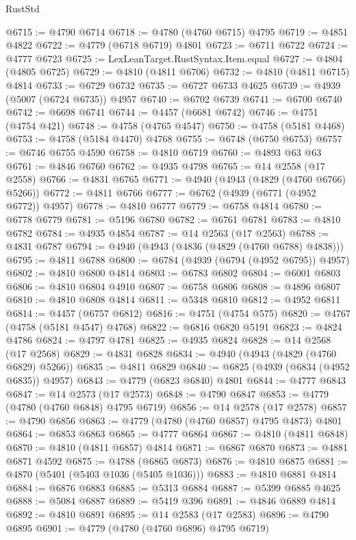 \begin{lexlean}{RustStd}
\begin{coremodule}
@6715 := @4790 @6714
@6718 := @4780 (@4760 @6715) @4795
@6719 := @4851 @4822
@6722 := @4779 (@6718 @6719) @4801
@6723 := @6711 @6722
@6724 := @4777 @6723
@6725 := LexLeanTarget.RustSyntax.Item.equal
@6727 := @4804 (@4805 @6725)
@6729 := @4810 (@4811 @6706)
@6732 := @4810 (@4811 @6715) @4814
@6733 := @6729 @6732
@6735 := @6727 @6733 @4625
@6739 := @4939 (@5007 (@6724 @6735)) @4957
@6740 := @6702 @6739
@6741 := @6700 @6740
@6742 := @6698 @6741
@6744 := @4457 (@6681 @6742)
@6746 := @4751 (@4754 @421)
@6748 := @4758 (@4765 @4547)
@6750 := @4758 (@5181 @4468)
@6753 := @4758 (@5184 @4470) @4768
@6755 := @6748 (@6750 @6753)
@6757 := @6746 @6755 @4590
@6758 := @4810 @6719
@6760 := @4893 @63 @63
@6761 := @4846 @6760
@6762 := @4935 @4798
@6765 := @14 @2558 (@17 @2558)
@6766 := @4831 @6765
@6771 := @4940 (@4943 (@4829 (@4760 @6766) @5266))
@6772 := @4811 @6766
@6777 := @6762 (@4939 (@6771 (@4952 @6772)) @4957)
@6778 := @4810 @6777
@6779 := @6758 @4814
@6780 := @6778 @6779
@6781 := @5196 @6780
@6782 := @6761 @6781
@6783 := @4810 @6782
@6784 := @4935 @4854
@6787 := @14 @2563 (@17 @2563)
@6788 := @4831 @6787
@6794 := @4940 (@4943 (@4836 (@4829 (@4760 @6788) @4838)))
@6795 := @4811 @6788
@6800 := @6784 (@4939 (@6794 (@4952 @6795)) @4957)
@6802 := @4810 @6800 @4814
@6803 := @6783 @6802
@6804 := @6001 @6803
@6806 := @4810 @6804 @4910
@6807 := @6758 @6806
@6808 := @4896 @6807
@6810 := @4810 @6808 @4814
@6811 := @5348 @6810
@6812 := @4952 @6811
@6814 := @4457 (@6757 @6812)
@6816 := @4751 (@4754 @575)
@6820 := @4767 (@4758 (@5181 @4547) @4768)
@6822 := @6816 @6820 @5191
@6823 := @4824 @4786
@6824 := @4797 @4781
@6825 := @4935 @6824
@6828 := @14 @2568 (@17 @2568)
@6829 := @4831 @6828
@6834 := @4940 (@4943 (@4829 (@4760 @6829) @5266))
@6835 := @4811 @6829
@6840 := @6825 (@4939 (@6834 (@4952 @6835)) @4957)
@6843 := @4779 (@6823 @6840) @4801
@6844 := @4777 @6843
@6847 := @14 @2573 (@17 @2573)
@6848 := @4790 @6847
@6853 := @4779 (@4780 (@4760 @6848) @4795 @6719)
@6856 := @14 @2578 (@17 @2578)
@6857 := @4790 @6856
@6863 := @4779 (@4780 (@4760 @6857) @4795 @4873) @4801
@6864 := @6853 @6863
@6865 := @4777 @6864
@6867 := @4810 (@4811 @6848)
@6870 := @4810 (@4811 @6857) @4814
@6871 := @6867 @6870
@6873 := @4881 @6871 @4592
@6875 := @4788 (@6865 @6873)
@6876 := @4810 @6875
@6881 := @4870 (@5401 (@5403 @1036 (@5405 @1036)))
@6883 := @4810 @6881 @4814
@6884 := @6876 @6883
@6885 := @5313 @6884
@6887 := @5399 @6885 @4625
@6888 := @5084 @6887
@6889 := @5419 @396
@6891 := @4846 @6889 @4814
@6892 := @4810 @6891
@6895 := @14 @2583 (@17 @2583)
@6896 := @4790 @6895
@6901 := @4779 (@4780 (@4760 @6896) @4795 @6719)

\end{coremodule}
\end{lexlean}
